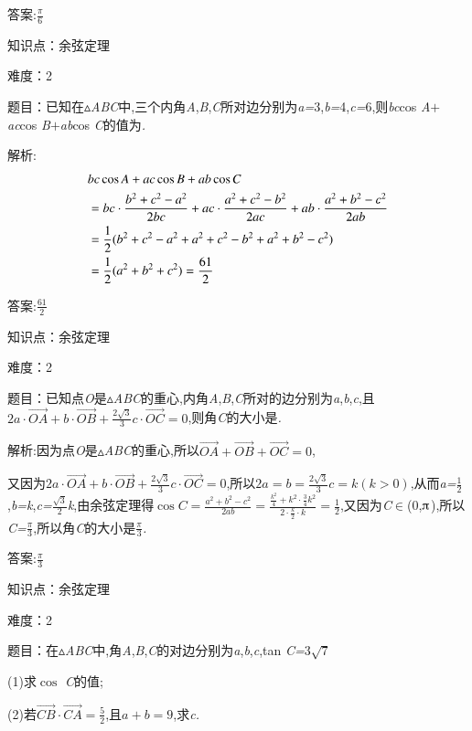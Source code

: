 \documentclass{article} %
\begin{document}
 答案:$\frac{\pi}{6}$

知识点：余弦定理

难度：2


 题目：已知在$\mathrm{\vartriangle}$\textit{ABC}中,三个内角\textit{A},\textit{B},\textit{C}所对边分别为\textit{a=}3,\textit{b=}4,\textit{c=}6,则\textit{bc}cos \textit{A$+$ac}cos \textit{B$+$ab}cos \textit{C}的值为\textit{\underbar{　　　　　}.~}

 解析:
\begin{align}
\notag
&bc\cos A+ac\cos B+ab\cos C\\
&=bc\cdot \frac{b^2+c^2-a^2}{2bc}+ac\cdot \frac{a^2+c^2-b^2}{2ac}+ab\cdot \frac{a^2+b^2-c^2}{2ab}\\
&=\frac{1}{2}(b^2+c^2-a^2+a^2+c^2-b^2+a^2+b^2-c^2)\\
&=\frac{1}{2}(a^2+b^2+c^2)=\frac{61}{2}
\end{align}

 答案:$\frac{61}{2}$

知识点：余弦定理

难度：2


 题目：已知点\textit{O}是$\mathrm{\vartriangle}$\textit{ABC}的重心,内角\textit{A},\textit{B},\textit{C}所对的边分别为\textit{a},\textit{b},\textit{c},且$2a\cdot \vec{OA}+b\cdot\vec{OB}+\frac{2\sqrt{3}}{3}c\cdot\vec{OC}=0$,则角\textit{C}的大小是\textit{\underbar{　　　　　}.~}

 解析:因为点\textit{O}是$\mathrm{\vartriangle}$\textit{ABC}的重心,所以$\vec{OA}+\vec{OB}+\vec{OC}=0$,

又因为$2a\cdot \vec{OA}+b\cdot\vec{OB}+\frac{2\sqrt{3}}{3}c\cdot\vec{OC}=0$,所以$2a=b=\frac{2\sqrt{3}}{3}c=k(k>0)$,从而\textit{a=}$\frac{1}{2}$,\textit{b=k},\textit{c=}$\frac{\sqrt{3}}{2}$\textit{k},由余弦定理得$\cos C=\frac{a^2+b^2-c^2}{2ab}=\frac{\frac{k^2}{4}+k^2\cdot \frac{3}{4}k^2}{2\cdot \frac{k}{2}\cdot k}=\frac{1}{2}$,又因为\textit{C}$\mathrm{\in}$(0,$\piup$),所以\textit{C=}$\frac{\pi}{3}$,所以角\textit{C}的大小是$\frac{\pi}{3}$\textit{.}

 答案:$\frac{\pi}{3}$

知识点：余弦定理

难度：2


 题目：在$\mathrm{\vartriangle}$\textit{ABC}中,角\textit{A},\textit{B},\textit{C}的对边分别为\textit{a},\textit{b},\textit{c},tan \textit{C=}$3\sqrt{7}$

 (1)求$\cos$ \textit{C}的值;

 (2)若$\vec{CB}\cdot\vec{CA}=\frac{5}{2}$,且$a+b=9$,求\textit{c.}
\end{document}
